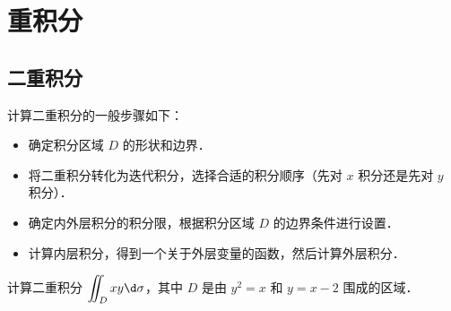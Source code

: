 \documentclass[12pt, a4paper, oneside, UTF8]{ctexbook}
\begin{document}
% 
\else
\fi
\chapter{重积分}
\section{二重积分}
\begin{theorem}
计算二重积分的一般步骤如下：
\begin{itemize}
    \item 确定积分区域 $D$ 的形状和边界．
    \item 将二重积分转化为迭代积分，选择合适的积分顺序（先对 $x$ 积分还是先对 $y$ 积分）．
    \item 确定内外层积分的积分限，根据积分区域 $D$ 的边界条件进行设置．
    \item 计算内层积分，得到一个关于外层变量的函数，然后计算外层积分．
\end{itemize}   
\end{theorem}
\begin{example}
    计算二重积分 $\displaystyle\iint_D xy \d \sigma$，其中 $D$ 是由 $y^2 = x$ 和 $y = x -2$ 围成的区域．
\end{example}
\end{document}
